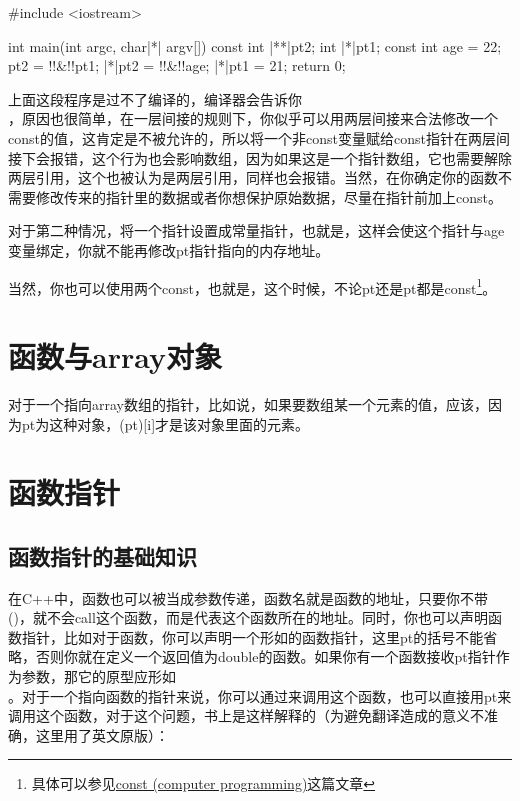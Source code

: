 \begin{cpp}
#include <iostream>

int main(int argc, char|*| argv[]) {
    const int |**|pt2;
    int |*|pt1;
    const int age = 22;
    pt2 = !!&!!pt1;
    |*|pt2 = !!&!!age;
    |*|pt1 = 21;
    return 0;
}
\end{cpp}

上面这段程序是过不了编译的，编译器会告诉你\\ ，原因也很简单，在一层间接的规则下，你似乎可以用两层间接来合法修改一个const的值，这肯定是不被允许的，所以将一个非const变量赋给const指针在两层间接下会报错，这个行为也会影响数组，因为如果这是一个指针数组，它也需要解除两层引用，这个也被认为是两层引用，同样也会报错。当然，在你确定你的函数不需要修改传来的指针里的数据或者你想保护原始数据，尽量在指针前加上const。

对于第二种情况，将一个指针设置成常量指针，也就是，这样会使这个指针与age变量绑定，你就不能再修改pt指针指向的内存地址。

当然，你也可以使用两个const，也就是，这个时候，不论pt还是\thinspace\fira{*}pt都是const\footnote{具体可以参见\thinspace\href{https://en.wikipedia.org/wiki/Const_(computer_programming)}{const (computer programming)}\thinspace 这篇文章}。

\addtocounter{section}{5}

\section{函数与array对象}

对于一个指向array数组的指针，比如说，如果要数组某一个元素的值，应该，因为\thinspace\fira{*}pt为这种对象，(\fira{*}pt)[i]才是该对象里面的元素。

\addtocounter{section}{1}

\section{函数指针}

\subsection{函数指针的基础知识}

在C++中，函数也可以被当成参数传递，函数名就是函数的地址，只要你不带()，就不会call这个函数，而是代表这个函数所在的地址。同时，你也可以声明函数指针，比如对于函数，你可以声明一个形如的函数指针，这里\thinspace\fira{*}pt的括号不能省略，否则你就在定义一个返回值为double\fira{*}的函数。如果你有一个函数接收pt指针作为参数，那它的原型应形如\\ \codeline{));}。对于一个指向函数的指针来说，你可以通过来调用这个函数，也可以直接用pt来调用这个函数，对于这个问题，书上是这样解释的（为避免翻译造成的意义不准确，这里用了英文原版）：

